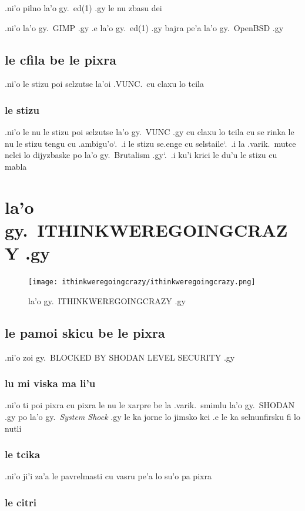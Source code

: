 \documentclass{report}
\newcommand\sds{\spacefactor\sfcode`.\ \space}
\begin{document}
.ni'o pilno la'o gy.\ ed(1) .gy le nu zbasu dei

.ni'o la'o gy.\ GIMP .gy .e la'o gy.\ ed(1) .gy bajra pe'a la'o gy.\ OpenBSD .gy

\section{le cfila be le pixra}
.ni'o le stizu poi selzutse la'oi .VUNC.\ cu claxu lo tcila

\subsection{le stizu}
.ni'o le nu le stizu poi selzutse la'o gy.\ VUNC .gy cu claxu lo tcila cu se rinka le nu le stizu tengu cu .ambigu'o\sds  .i le stizu se.enge cu selstaile\sds  .i la .varik.\ mutce nelci lo dijyzbaske po la'o gy.\ Brutalism .gy\sds  .i ku'i krici le du'u le stizu cu mabla

\chapter{la'o gy.\ ITHINKWEREGOINGCRAZY .gy}
\begin{figure}[ht]
	\centering
	\texttt{[image: ithinkweregoingcrazy/ithinkweregoingcrazy.png]}
	\caption[center]{la'o gy.\ ITHINKWEREGOINGCRAZY .gy}
\end{figure}
\section{le pamoi skicu be le pixra}
.ni'o zoi gy.\ BLOCKED BY SHODAN LEVEL SECURITY .gy

\subsection{lu mi viska ma li'u}
.ni'o ti poi pixra cu pixra le nu le xarpre be la .varik.\ smimlu la'o gy.\ SHODAN .gy po la'o gy.\ \textit{System Shock} .gy le ka jorne lo jimsko kei .e le ka selnunfirsku fi lo nutli

\subsection{le tcika}
.ni'o ji'i za'a le pavrelmasti cu vasru pe'a lo su'o pa pixra

\subsection{le citri}
\end{document}

